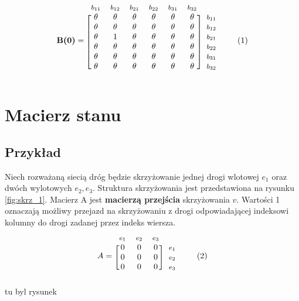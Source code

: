 \documentclass[12pt]{book}
\theoremstyle{plain}
\newcommand\addtag{\refstepcounter{equation}
\renewcommand{\labelenumii}{\theenumii}
\renewcommand{\theenumii}{\theenumi.\arabic{enumii}.}
\tag{\theequation}}
\begin{document}
\begin{equation*}
\textbf{B(0)}=
\begin{blockarray}{*{6}{c} l}
\begin{block}{*{6}{>{$\footnotesize}c<{$}} l}
$b_{11}$ & $b_{12}$ & $b_{21}$ & $b_{22}$ & $b_{31}$ & $b_{32}$ & \\
\end{block}
\begin{block}{[*{6}{c}]>{$\footnotesize}l<{$}}
\theta & \theta & \theta & \theta & \theta & \theta &   $b_{11}$ \\
\theta & \theta & \theta & \theta & \theta & \theta &   $b_{12}$ \\
\theta & 1 & \theta & \theta & \theta & \theta &   $b_{21}$ \\
\theta & \theta & \theta & \theta & \theta & \theta &   $b_{22}$ \\
\theta & \theta & \theta & \theta & \theta & \theta &   $b_{31}$ \\
\theta & \theta & \theta & \theta & \theta & \theta &   $b_{32}$ \\
\end{block}
\end{blockarray} \addtag
\end{equation*}

\section{Macierz stanu}
\subsection{Przykład}
Niech rozważaną siecią dróg będzie skrzyżowanie jednej drogi wlotowej $e_1$ oraz dwóch wylotowych $e_2,e_3$. Struktura skrzyżowania jest przedstawiona na rysunku \ref{fig:skrz_1}.
Macierz A jest \textbf{macierzą przejścia} skrzyżowania $v$. Wartości 1 oznaczają możliwy przejazd na skrzyżowaniu z drogi odpowiadającej indeksowi kolumny do drogi zadanej przez indeks wiersza.
\begin{equation*}
  A=
  \begin{blockarray}{*{3}{c} l}
    \begin{block}{*{3}{>{$\footnotesize}c<{$}} l}
     $e_1$ & $e_2$ & $e_3$\\
    \end{block}
    \begin{block}{[*{3}{c}]>{$\footnotesize}l<{$}}
       0 & 0 & 0 & $e_1$ \\
       0 & 0 & 0 & $e_2$ \\
       0 & 0 & 0 & $e_3$ \\
    \end{block}
  \end{blockarray} \addtag
\end{equation*}
 tu byl rysunek
\end{document}
